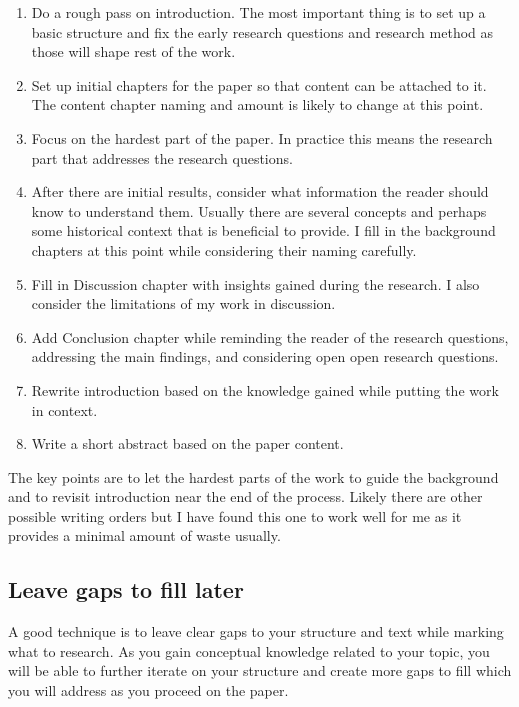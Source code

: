 \begin{enumerate}
    \item Do a rough pass on introduction. The most important thing is to set up a basic structure and fix the early research questions and research method as those will shape rest of the work.
    \item Set up initial chapters for the paper so that content can be attached to it. The content chapter naming and amount is likely to change at this point.
    \item Focus on the hardest part of the paper. In practice this means the research part that addresses the research questions.
    \item After there are initial results, consider what information the reader should know to understand them. Usually there are several concepts and perhaps some historical context that is beneficial to provide. I fill in the background chapters at this point while considering their naming carefully.
    \item Fill in Discussion chapter with insights gained during the research. I also consider the limitations of my work in discussion.
    \item Add Conclusion chapter while reminding the reader of the research questions, addressing the main findings, and considering open open research questions.
    \item Rewrite introduction based on the knowledge gained while putting the work in context.
    \item Write a short abstract based on the paper content.
\end{enumerate}

The key points are to let the hardest parts of the work to guide the background and to revisit introduction near the end of the process.
Likely there are other possible writing orders but I have found this one to work well for me as it provides a minimal amount of waste usually.

\subsection{Leave gaps to fill later}

A good technique is to leave clear gaps to your structure and text while marking what to research.
As you gain conceptual knowledge related to your topic, you will be able to further iterate on your structure and create more gaps to fill which you will address as you proceed on the paper.


